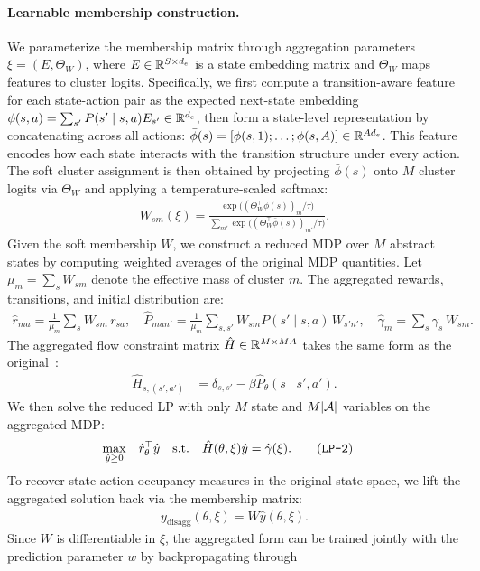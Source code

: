 \paragraph{Learnable membership construction.}
We parameterize the membership matrix through aggregation parameters $\xi = (E, \Theta_W)$, where $E \in \mathbb{R}^{S \times d_e}$ is a state embedding matrix and $\Theta_W$ maps features to cluster logits. Specifically, we first compute a transition-aware feature for each state-action pair as the expected next-state embedding $\phi(s, a) = \sum_{s'} P(s' \mid s, a) E_{s'} \in \mathbb{R}^{d_e}$, then form a state-level representation by concatenating across all actions: $\bar\phi(s) = [\phi(s,1); \ldots; \phi(s,A)] \in \mathbb{R}^{A d_e}$. This feature encodes how each state interacts with the transition structure under every action. The soft cluster assignment is then obtained by projecting $\bar\phi(s)$ onto $M$ cluster logits via $\Theta_W$ and applying a temperature-scaled softmax:
\begin{align*}
    W_{sm}(\xi) = \frac{\exp\bigl((\Theta_W^\top \bar\phi(s))_m / \tau\bigr)}{\sum_{m'} \exp\bigl((\Theta_W^\top \bar\phi(s))_{m'} / \tau\bigr)}.
\end{align*}
Given the soft membership $W$, we construct a reduced MDP over $M$ abstract states by computing weighted averages of the original MDP quantities. Let $\mu_m = \sum_s W_{sm}$ denote the effective mass of cluster $m$. The aggregated rewards, transitions, and initial distribution are:
\begin{align*}
    \hat r_{ma} = \frac{1}{\mu_m} \sum_s W_{sm}\, r_{sa}, \quad
    \hat P_{man'} = \frac{1}{\mu_m} \sum_{s, s'} W_{sm} P(s' \mid s, a)\, W_{s'n'}, \quad 
    \hat\gamma_m = \sum_s \gamma_s\, W_{sm}.
\end{align*}
The aggregated flow constraint matrix $\hat H \in \mathbb{R}^{M \times MA}$ takes the same form as the original~:
\begin{align*}
    \hat{H}_{s,(s',a')} & = \delta_{s,s'} - \beta \hat{P}_{\theta}(s \mid s', a').
\end{align*}
We then solve the reduced LP with only $M$ state and $M|{\mathcal{A}}|$ variables on the aggregated MDP:
\begin{align}
    \max_{\hat y \geq 0} \quad & \hat r_\theta^\top \hat y \quad
    \text{s.t.} \quad \hat H(\theta, \xi) \hat y = \hat\gamma(\xi). \tag{\texttt{LP-2}} \label{eq:agg_lp}
\end{align}
To recover state-action occupancy measures in the original state space, we lift the aggregated solution back via the membership matrix:
\begin{align*}
    y_{\text{disagg}}(\theta, \xi) = W\hat{y} (\theta, \xi).
\end{align*}
Since $W$ is differentiable in $\xi$, the aggregated form can be trained jointly with the prediction parameter $w$ by backpropagating through~

